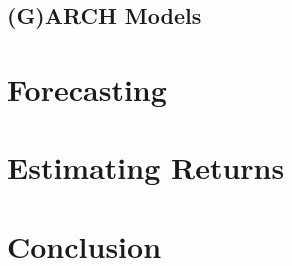 \documentclass[a4paper, 11pt]{article}
\theoremstyle{definition} %
\numberwithin{equation}{section}
\begin{document}
  \subsection{(G)ARCH Models} \label{sub:garch}

\section{Forecasting} \label{sec:forecasting}

\section{Estimating Returns} \label{sec:estimatingreturns}

\section{Conclusion} \label{sec:conclusion}

\newpage


\end{document}
